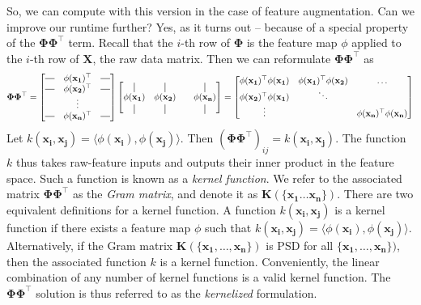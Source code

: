 \documentclass{article}
\newcommand*{\vertbar}{\rule[-1ex]{0.5pt}{2.5ex}}
\newcommand*{\horzbar}{\rule[.5ex]{2.5ex}{0.5pt}}
\begin{document}
So, we can compute with this version in the case of feature augmentation. Can we improve our runtime further? Yes, as it turns out -- because of a special property of the $\mathbf{\Phi\Phi^{\top}}$ term. Recall that the $i$-th row of $\mathbf{\Phi}$ is the feature map $\phi$ applied to the $i$-th row of $\mathbf{X}$, the raw data matrix. Then we can reformulate $\mathbf{\Phi\Phi^{\top}}$ as $$\mathbf{\Phi\Phi^{\top}} = \begin{bmatrix} \horzbar & \phi(\mathbf{x_1})^{\top} & \horzbar  \\ \horzbar & \phi(\mathbf{x_2})^{\top} & \horzbar \\ & \vdots & \\ \horzbar & \phi(\mathbf{x_n})^{\top} & \horzbar \end{bmatrix}\begin{bmatrix} \vertbar & \vertbar & & \vertbar \\ \phi(\mathbf{x_1}) & \phi(\mathbf{x_2}) & & \phi(\mathbf{x_n}) \\ \vertbar & \vertbar & & \vertbar \end{bmatrix} = \begin{bmatrix}\phi(\mathbf{x_1})^{\top}\phi(\mathbf{x_1}) & \phi(\mathbf{x_1})^{\top}\phi(\mathbf{x_2}) & \hdots \\ \phi(\mathbf{x_2})^{\top}\phi(\mathbf{x_1}) & \ddots & \\ \vdots & & \phi(\mathbf{x_n})^{\top}\phi(\mathbf{x_n}) \end{bmatrix}$$ Let $k(\mathbf{x_i, x_j}) = \langle \phi(\mathbf{x_i}), \phi(\mathbf{x_j}) \rangle$. Then $(\mathbf{\Phi\Phi^{\top}})_{ij} = k(\mathbf{x_i, x_j})$. The function $k$ thus takes raw-feature inputs and outputs their inner product in the feature space. Such a function is known as a \textit{kernel function}. We refer to the associated matrix $\mathbf{\Phi\Phi^{\top}}$ as the \textit{Gram matrix}, and denote it as $\mathbf{K(\{\mathbf{x_1} \hdots \mathbf{x_n}\})}$. There are two equivalent definitions for a kernel function. A function $k(\mathbf{x_i, x_j})$ is a kernel function if there exists a feature map $\phi$ such that $k(\mathbf{x_i, x_j}) = \langle \phi(\mathbf{x_i}), \phi(\mathbf{x_j})\rangle$. Alternatively, if the Gram matrix $\mathbf{K(\{\mathbf{x_1, \hdots, x_n}\})}$ is PSD for all $\{\mathbf{x_1, \hdots, x_n}\})$, then the associated function $k$ is a kernel function. Conveniently, the linear combination of any number of kernel functions is a valid kernel function. The $\mathbf{\Phi\Phi^{\top}}$ solution is thus referred to as the \textit{kernelized} formulation. \\\\\ 
\end{document}
